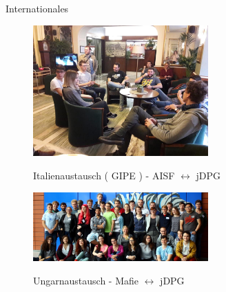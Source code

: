 \documentclass[
]{beamer}
\begin{document}
\begin{frame}{Internationales}
  \begin{figure}
    \centering
    \includegraphics[width=0.6\textwidth]{figure/gipe_2018}
    \begin{center}
      Italienaustausch ( GIPE ) - AISF $\leftrightarrow$ jDPG
    \end{center}
  \end{figure}

  \begin{figure}
    \centering
    \includegraphics[width=0.6\textwidth]{figure/mafie_2017}
    \begin{center}
      Ungarnaustausch - Mafie $\leftrightarrow$ jDPG
    \end{center}
  \end{figure}
\end{frame}
\end{document}

